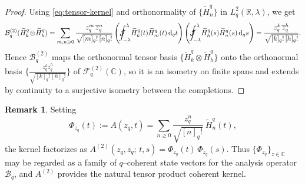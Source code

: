 \documentclass[10pt]{amsart}
\theoremstyle{plain}
\newtheorem{corollary}[theorem]{Corollary}
\theoremstyle{definition}
\newtheorem{remark}[theorem]{Remark}
\renewcommand{\bar}[1]{\overline{#1}}
\newcommand{\Jint}{\mathcal{J}\mspace{-20mu}\int  }
\def\ge{\geqslant}
\begin{document}
\begin{proof}
Using \eqref{eq:tensor-kernel} and orthonormality of $\{\widetilde H^q_n\}$ in $L^2_q(\mathbb{R},\lambda)$, we get
\[
\mathcal{B}_q^{(2)}(\widetilde H^q_k\!\otimes\!\widetilde H^q_h)
=\sum_{m,n\ge0}\frac{z_q^m\,\bar z_q^n}{\sqrt{[m]_q!\,[n]_q!}}
\left(\Jint_{-\lambda}^{\lambda}\!\widetilde H^q_k(t)\widetilde H^q_m(t)\,\mathrm{d}_qt\right)
\left(\Jint_{-\lambda}^{\lambda}\!\widetilde H^q_h(s)\widetilde H^q_n(s)\,\mathrm{d}_qs\right)
=\frac{z_q^k\,\bar z_q^h}{\sqrt{[k]_q!\,[h]_q!}}.
\]
Hence $\mathcal{B}_q^{(2)}$ maps the orthonormal tensor basis $\{\widetilde H^q_k\otimes \widetilde H^q_h\}$ onto the orthonormal basis 
$\{\frac{z_q^k\bar z_q^h}{\sqrt{[k]_q!\,[h]_q!}}\}$ of $\mathcal{F}^{(2)}_q(\mathbb{C})$, so it is an isometry on finite spans and extends by continuity to a surjective isometry between the completions.
\end{proof}

\begin{remark}
Setting
\[
\Phi_{z_q}(t):=A(z_q,t)=\sum_{n\ge0}\frac{z_q^n}{\sqrt{[n]_q!}}\ \widetilde H^q_n(t),
\]
the kernel factorizes as $A^{(2)}(z_q,\bar z_q;\,t,s)=\Phi_{z_q}(t)\,\Phi_{\bar z_q}(s)$. 
Thus $\{\Phi_{z_q}\}_{z\in\mathbb{C}}$ may be regarded as a family of $q$–coherent state vectors for the analysis operator $\mathcal{B}_q$, and $A^{(2)}$ provides the natural tensor product coherent kernel. 
\end{remark}
\end{document}
